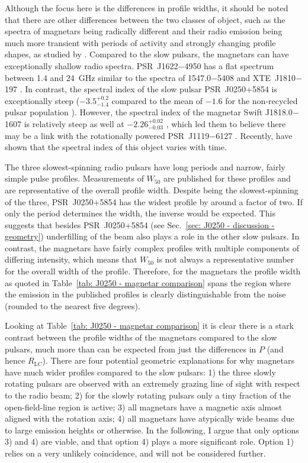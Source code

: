 Although the focus here is the differences in profile widths, it should be noted that there are other differences between the two classes of object, such as the spectra of magnetars being radically different and their radio emission being much more transient with periods of activity and strongly changing profile shapes, as studied by \citet{SSW+2009, DJW+2018, LLD+2019, DLB+2019,LJS+2021}.
Compared to the slow pulsars, the magnetars can have exceptionally shallow radio spectra. PSR~J1622$-$4950 has a flat spectrum between 1.4 and 24~GHz \citep{KJLB2011} similar to the spectra of 1547.0$-$5408 and XTE~J1810$-$197 \citep{CRJ+2007b, CRHR2007a, KSJ+2007}. In contrast, the spectral index of the slow pulsar PSR~J0250+5854 is exceptionally steep ($-3.5^{+0.2}_{-1.4}$ compared to the mean of $-1.6$ for the non-recycled pulsar population \citealt{JSK+2018}). However, the spectral index of the magnetar Swift J1818.0$-$1607 is relatively steep as well at $-2.26^{+0.02}_{-0.03}$ \citep{LSJB2020}, which led them to believe there may be a link with the rotationally powered PSR~J1119$-$6127 \citep[e.g][]{MPD+2017,DJW+2018}. Recently, \citet{CCC+2020} have shown that the spectral index of this object varies with time. 

The three slowest-spinning radio pulsars have long periods and narrow, fairly simple pulse profiles. Measurements of $W_{50}$ are published for these profiles and are representative of the overall profile width. Despite being the slowest-spinning of the three, PSR~J0250+5854 has the widest profile by around a factor of two. If only the period determines the width, the inverse would be expected. This suggests that besides PSR~J0250+5854 (see Sec.~\ref{sec: J0250 - discussion - geometry}) underfilling of the beam also plays a role in the other slow pulsars. In contrast, the magnetars have fairly complex profiles with multiple components of differing intensity, which means that $W_{50}$ is not always a representative number for the overall width of the profile. Therefore, for the magnetars the profile width as quoted in Table~\ref{tab: J0250 - magnetar comparison} spans the region where the emission in the published profiles is clearly distinguishable from the noise (rounded to the nearest five degrees).

Looking at Table~\ref{tab: J0250 - magnetar comparison} it is clear there is a stark contrast between the profile widths of the magnetars compared to the slow pulsars, much more than can be expected from just the differences in $P$ (and hence $R_\mathrm{LC}$). There are four potential geometric explanations for why magnetars have much wider profiles compared to the slow pulsars: 1) the three slowly rotating pulsars are observed with an extremely grazing line of sight with respect to the radio beam; 2) for the slowly rotating pulsars only a tiny fraction of the open-field-line region is active; 3) all magnetars have a magnetic axis almost aligned with the rotation axis; 4) all magnetars have atypically wide beams due to large emission heights or otherwise. In the following, I argue that only options 3) and 4) are viable, and that option 4) plays a more significant role. Option 1) relies on a very unlikely coincidence, and will not be considered further. 

